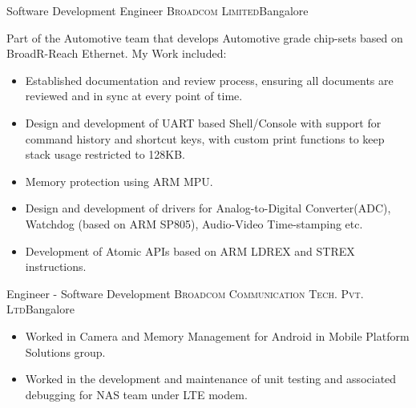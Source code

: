\documentclass[11pt,a4paper,sans]{moderncv}
\begin{document}
                {Software Development Engineer}
                {\textsc{Broadcom Limited}}{Bangalore}
                {}
                {
                    Part of the Automotive team that develops Automotive grade
                    chip-sets based on BroadR-Reach Ethernet.
                    \newline{}\newline{}
                    My Work included:
                    \begin{itemize}
                        \item Established documentation and review process,
                              ensuring all documents are reviewed and in sync at
                              every point of time.
                        \item Design and development of UART based Shell/Console
                              with support for command history and shortcut
                              keys, with custom print functions to keep stack
                              usage restricted to 128KB.
                        \item Memory protection using ARM MPU.
                        \item Design and development of drivers for
                              Analog-to-Digital Converter(ADC), Watchdog (based
                              on ARM SP805), Audio-Video Time-stamping etc.
                        \item Development of Atomic APIs based on ARM LDREX and
                              STREX instructions.
                    \end{itemize}}

                {Engineer - Software Development}
                {\textsc{Broadcom Communication Tech. Pvt. Ltd}}{Bangalore}
                {}
                {
                    \begin{itemize}
                        \item Worked in Camera and Memory Management for Android
                              in Mobile Platform Solutions group.
                        \item Worked in the development and maintenance of unit
                              testing and associated debugging for NAS team
                              under LTE modem.
                    \end{itemize}
                }
\end{document}
